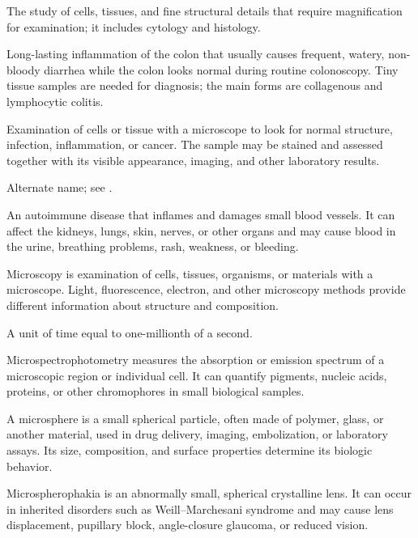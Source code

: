  The study of cells, tissues, and fine structural details that require magnification for examination; it includes cytology and histology.

 Long-lasting inflammation of the colon that usually causes frequent, watery, non-bloody diarrhea while the colon looks normal during routine colonoscopy. Tiny tissue samples are needed for diagnosis; the main forms are collagenous and lymphocytic colitis.

 Examination of cells or tissue with a microscope to look for normal structure, infection, inflammation, or cancer. The sample may be stained and assessed together with its visible appearance, imaging, and other laboratory results.

 Alternate name; see .

 An autoimmune disease that inflames and damages small blood vessels. It can affect the kidneys, lungs, skin, nerves, or other organs and may cause blood in the urine, breathing problems, rash, weakness, or bleeding.

 Microscopy is examination of cells, tissues, organisms, or materials with a microscope. Light, fluorescence, electron, and other microscopy methods provide different information about structure and composition.

 A unit of time equal to one-millionth of a second.

 Microspectrophotometry measures the absorption or emission spectrum of a microscopic region or individual cell. It can quantify pigments, nucleic acids, proteins, or other chromophores in small biological samples.

 A microsphere is a small spherical particle, often made of polymer, glass, or another material, used in drug delivery, imaging, embolization, or laboratory assays. Its size, composition, and surface properties determine its biologic behavior.

 Microspherophakia is an abnormally small, spherical crystalline lens. It can occur in inherited disorders such as Weill--Marchesani syndrome and may cause lens displacement, pupillary block, angle-closure glaucoma, or reduced vision.

